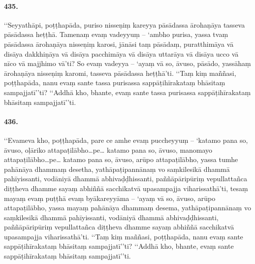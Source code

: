 \paragraph{435.} ‘‘Seyyathāpi, poṭṭhapāda, puriso nisseṇiṃ kareyya pāsādassa ārohaṇāya tasseva pāsādassa heṭṭhā. Tamenaṃ evaṃ vadeyyuṃ – ‘ambho purisa, yassa tvaṃ pāsādassa ārohaṇāya nisseṇiṃ karosi, jānāsi taṃ pāsādaṃ, puratthimāya vā disāya dakkhiṇāya vā disāya pacchimāya vā disāya uttarāya vā disāya ucco vā nīco vā majjhimo vā’ti? So evaṃ vadeyya – ‘ayaṃ vā so, āvuso, pāsādo, yassāhaṃ ārohaṇāya nisseṇiṃ karomi, tasseva pāsādassa heṭṭhā’ti. ‘‘Taṃ kiṃ maññasi, poṭṭhapāda, nanu evaṃ sante tassa purisassa sappāṭihīrakataṃ bhāsitaṃ sampajjatī’’ti? ‘‘Addhā kho, bhante, evaṃ sante tassa purisassa sappāṭihīrakataṃ bhāsitaṃ sampajjatī’’ti.

\paragraph{436.} ‘‘Evameva kho, poṭṭhapāda, pare ce amhe evaṃ puccheyyuṃ – ‘katamo pana so, āvuso, oḷāriko attapaṭilābho…pe… katamo pana so, āvuso, manomayo attapaṭilābho…pe… katamo pana so, āvuso, arūpo attapaṭilābho, yassa tumhe pahānāya dhammaṃ desetha, yathāpaṭipannānaṃ vo saṃkilesikā dhammā pahīyissanti, vodāniyā dhammā abhivaḍḍhissanti, paññāpāripūriṃ vepullattañca diṭṭheva dhamme sayaṃ abhiññā sacchikatvā upasampajja viharissathā’ti, tesaṃ mayaṃ evaṃ puṭṭhā evaṃ byākareyyāma – ‘ayaṃ vā so, āvuso, arūpo attapaṭilābho, yassa mayaṃ pahānāya dhammaṃ desema, yathāpaṭipannānaṃ vo saṃkilesikā dhammā pahīyissanti, vodāniyā dhammā abhivaḍḍhissanti, paññāpāripūriṃ vepullattañca diṭṭheva dhamme sayaṃ abhiññā sacchikatvā upasampajja viharissathā’ti. ‘‘Taṃ kiṃ maññasi, poṭṭhapāda, nanu evaṃ sante sappāṭihīrakataṃ bhāsitaṃ sampajjatī’’ti? ‘‘Addhā kho, bhante, evaṃ sante sappāṭihīrakataṃ bhāsitaṃ sampajjatī’’ti.

